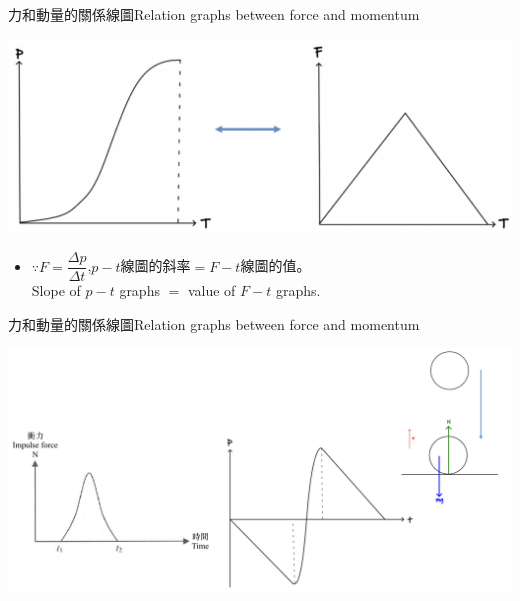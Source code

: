 \documentclass[13pt]{beamer}
\begin{document}
\begin{frame}{力和動量的關係線圖Relation graphs between force and momentum}
    \par{\par\centering
        \includegraphics[width=\textwidth]{assets/a8d214ae.png}
        \par}
    \bigskip
    \begin{itemize}
        \item []$\because F=\dfrac{\Delta p}{\Delta t}$,\hspace{1em}$p-t$線圖的斜率$=$$F-t$線圖的值。\\Slope of $p-t$ graphs $=$ value of $F-t$ graphs.
    \end{itemize}
\end{frame}





\begin{frame}{力和動量的關係線圖Relation graphs between force and momentum}
    \par{\par\centering
        \includegraphics[width=\textwidth]{assets/f231d810.png}
        \par}
\end{frame}
\end{document}
